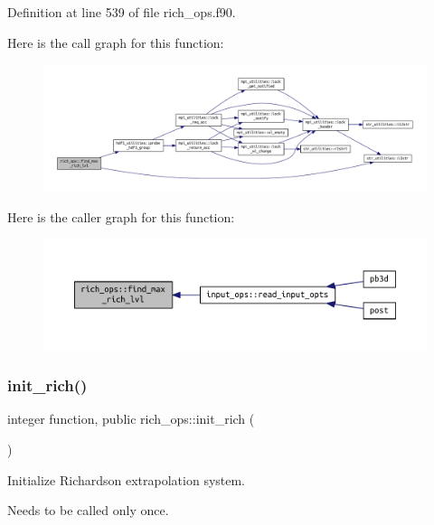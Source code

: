 Definition at line 539 of file rich\+\_\+ops.\+f90.

Here is the call graph for this function\+:\nopagebreak
\begin{figure}[H]
\begin{center}
\leavevmode
\includegraphics[width=350pt]{namespacerich__ops_a58e1bed1bed5c2d0b91cc7dc5e3099d9_cgraph}
\end{center}
\end{figure}
Here is the caller graph for this function\+:\nopagebreak
\begin{figure}[H]
\begin{center}
\leavevmode
\includegraphics[width=350pt]{namespacerich__ops_a58e1bed1bed5c2d0b91cc7dc5e3099d9_icgraph}
\end{center}
\end{figure}
\mbox{\label{namespacerich__ops_a9fbbda93eab8973d33063e277c489e7b}} 
\subsubsection{\texorpdfstring{init\+\_\+rich()}{init\_rich()}}
{\footnotesize\ttfamily integer function, public rich\+\_\+ops\+::init\+\_\+rich (\begin{DoxyParamCaption}{ }\end{DoxyParamCaption})}



Initialize Richardson extrapolation system. 

Needs to be called only once.

